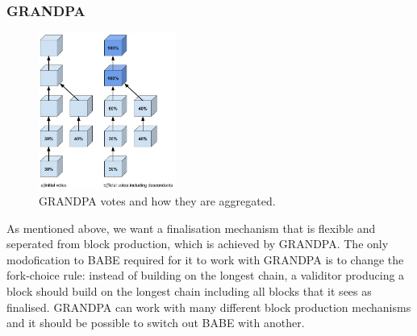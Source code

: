 \subsubsection{GRANDPA} \label{sec:grandpa}
\begin{figure}[h!]
  \centering
  \includegraphics[width=0.4\textwidth]{images/Grandpa.jpg}
  \caption{GRANDPA votes and how they are aggregated. }
    \label{fig:grandpa}
\end{figure}

As mentioned above, we want a finalisation mechanism that is flexible and seperated from block production, which is achieved by GRANDPA. The only modofication to BABE required for it to work with GRANDPA is to change the fork-choice rule: instead of building on the longest chain, a validitor producing a block should build on the longest chain including all blocks that it sees as finalised. GRANDPA can work with many different block production mechanisms and it should be possible to switch out BABE with another.

